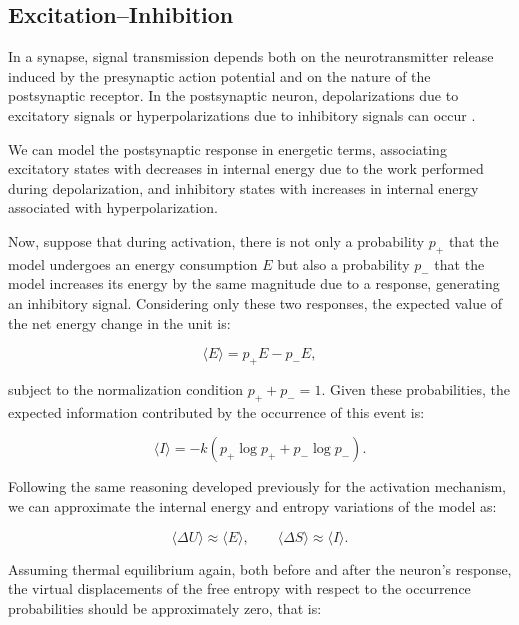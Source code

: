 \documentclass[12pt]{article}
\begin{document}
\subsection*{Excitation–Inhibition}

In a synapse, signal transmission depends both on the neurotransmitter release induced by the presynaptic action potential and on the nature of the postsynaptic receptor. In the postsynaptic neuron, depolarizations due to excitatory signals or hyperpolarizations due to inhibitory signals can occur \cite{dayan2001theoretical}.

We can model the postsynaptic response in energetic terms, associating excitatory states with decreases in internal energy due to the work performed during depolarization, and inhibitory states with increases in internal energy associated with hyperpolarization.

Now, suppose that during activation, there is not only a probability $p_+$ that the model undergoes an energy consumption $E$ but also a probability $p_-$ that the model increases its energy by the same magnitude due to a response, generating an inhibitory signal. Considering only these two responses, the expected value of the net energy change in the unit is:

\begin{equation}
\langle E \rangle = p_+ E - p_- E  ,
\end{equation}

subject to the normalization condition $p_+ + p_- = 1$. Given these probabilities, the expected information contributed by the occurrence of this event is:

\begin{equation}
\langle I \rangle = - k (p_+ \log p_+ + p_- \log p_-)  .
\end{equation}

Following the same reasoning developed previously for the activation mechanism, we can approximate the internal energy and entropy variations of the model as:

\begin{equation}
\langle \Delta U \rangle \approx \langle E \rangle  
,\qquad  
\langle \Delta S \rangle \approx \langle I \rangle.
\end{equation}

Assuming thermal equilibrium again, both before and after the neuron's response, the virtual displacements of the free entropy with respect to the occurrence probabilities should be approximately zero, that is:
\end{document}
